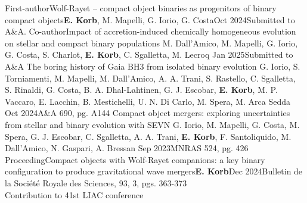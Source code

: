 %
%
%

\begin{experiences}
    \publicationtags
    {First-author}{Wolf-Rayet -- compact object binaries as progenitors of binary compact objects}{\textbf{E. Korb}, M. Mapelli, G. Iorio, G. Costa}{Oct 2024}{Submitted to A\&A.}{}
    \emptySeparator
    \publicationtags
    {Co-author}{Impact of accretion-induced chemically homogeneous evolution on stellar and compact binary populations}
    {M. Dall'Amico, M. Mapelli, G. Iorio, G. Costa, S. Charlot, \textbf{E. Korb}, C. Sgalletta, M. Lecroq}
    {Jan 2025}{Submitted to A\&A}
    {} 
    \emptySeparator
    \publicationtags
    {}{The boring history of Gaia BH3 from isolated binary evolution}
    {G. Iorio, S. Torniamenti, M. Mapelli, M. Dall'Amico, A. A. Trani, S. Rastello, C. Sgalletta, S. Rinaldi, G. Costa, B. A. Dhal-Lahtinen, G. J. Escobar, \textbf{E. Korb}, M. P. Vaccaro, E. Lacchin, B. Mestichelli, U. N. Di Carlo, M. Spera, M. Arca Sedda}
    {Oct 2024}{A\&A 690, pg. A144}
    {} 
    \emptySeparator
    \publicationtags
    {}{Compact object mergers: exploring uncertainties from stellar and binary evolution with SEVN}
    {G. Iorio, M. Mapelli, G. Costa, M. Spera, G. J. Escobar, C. Sgalletta, A. A. Trani, \textbf{E. Korb}, F. Santoliquido, M. Dall'Amico, N. Gaspari, A. Bressan}
    {Sep 2023}{MNRAS 524, pg. 426}
    {}      
    \emptySeparator
    \publicationtags
    {Proceeding}{Compact objects with Wolf-Rayet companions: a key binary configuration to produce gravitational wave mergers}{\textbf{E. Korb}}{Dec 2024}{Bulletin de la Société Royale des Sciences, 93, 3, pgs. 363-373 \\ Contribution to 41st LIAC conference}{}
    \emptySeparator
\end{experiences}

